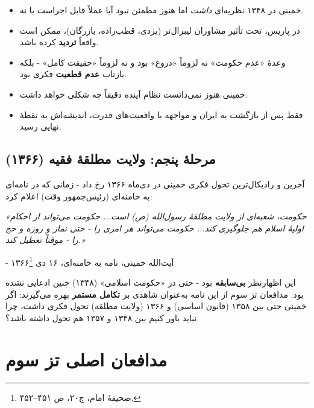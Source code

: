 \documentclass[12pt,a4paper]{book}
\newcommand{\keyword}[1]{\textbf{\textcolor{cPrimary}{#1}}}
\begin{document}
\begin{principleBox}
\begin{itemize}[label=\textcolor{cGold}{$\bullet$}, rightmargin=2em]
    \item خمینی در ۱۳۴۸ نظریه‌ای \textit{داشت} اما هنوز مطمئن نبود آیا عملاً قابل اجراست یا نه.
    \item در پاریس، تحت تأثیر مشاوران لیبرال‌تر (یزدی، قطب‌زاده، بازرگان)، ممکن است واقعاً \keyword{تردید} کرده باشد.
    \item وعدهٔ «عدم حکومت» نه لزوماً «دروغ» بود و نه لزوماً «حقیقت کامل» - بلکه بازتاب \keyword{عدم قطعیت} فکری بود.
    \item خمینی هنوز نمی‌دانست نظام آینده دقیقاً چه شکلی خواهد داشت.
    \item فقط پس از بازگشت به ایران و مواجهه با واقعیت‌های قدرت، اندیشه‌اش به نقطهٔ نهایی رسید.
\end{itemize}
\end{principleBox}

\subsection{مرحلهٔ پنجم: ولایت مطلقهٔ فقیه (۱۳۶۶)}

آخرین و رادیکال‌ترین تحول فکری خمینی در دی‌ماه ۱۳۶۶ رخ داد - زمانی که در نامه‌ای به خامنه‌ای (رئیس‌جمهور وقت) اعلام کرد:

\begin{warningBox}
\textit{«حکومت، شعبه‌ای از ولایت مطلقهٔ رسول‌الله (ص) است... حکومت می‌تواند از احکام اولیهٔ اسلام هم جلوگیری کند... حکومت می‌تواند هر امری را - حتی نماز و روزه و حج را - موقتاً تعطیل کند.»}

\hfill - آیت‌الله خمینی، نامه به خامنه‌ای، ۱۶ دی ۱۳۶۶\footnote{صحیفهٔ امام، ج۲۰، ص ۴۵۱–۴۵۲.}
\end{warningBox}

این اظهارنظر \keyword{بی‌سابقه} بود - حتی در «حکومت اسلامی» (۱۳۴۸) چنین ادعایی نشده بود. مدافعان تز سوم از این نامه به‌عنوان شاهدی بر \keyword{تکامل مستمر} بهره می‌گیرند: اگر خمینی حتی بین ۱۳۵۸ (قانون اساسی) و ۱۳۶۶ (ولایت مطلقه) تحول فکری داشت، چرا نباید باور کنیم بین ۱۳۴۸ و ۱۳۵۷ هم تحول داشته باشد؟

\section{مدافعان اصلی تز سوم}
\end{document}
